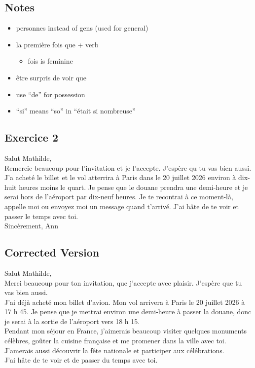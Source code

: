 \documentclass{book}
\begin{document}
        \subsection*{Notes}
            \begin{itemize}
                \item personnes instead of gens (used for general)
                \item la première fois que + verb
                \begin{itemize}
                    \item fois is feminine
                \end{itemize}
                \item être surpris de voir que
                \item use ``de'' for possession
                \item ``si'' means ``so'' in ``était si nombreuse''
            \end{itemize}

        \newpage 

        \subsection{Exercice 2}
            Salut Mathilde,
            \\
            Remercie beaucoup pour l'invitation et je l'accepte. J'espère qu tu vas bien aussi. 
            J'a acheté le billet et le vol atterrira à Paris dans le 20 juillet 2026 environ à dix-huit heures moins le quart.
            Je pense que le douane prendra une demi-heure et je serai hors de l'aéroport par dix-neuf heures. 
            Je te recontrai à ce moment-là, appelle moi ou envoyez moi un message quand t'arrivé. 
            J'ai hâte de te voir et passer le temps avec toi.
            \\
            Sincèrement,
            Ann

        \subsection*{Corrected Version}
            Salut Mathilde,
            \\
            Merci beaucoup pour ton invitation, que j'accepte avec plaisir. J'espère que tu vas bien aussi.
            \\
            J'ai déjà acheté mon billet d'avion. Mon vol arrivera à Paris le 20 juillet 2026 à 17 h 45. 
            Je pense que je mettrai environ une demi-heure à passer la douane, donc je serai à la sortie de l'aéroport vers 18 h 15.
            \\
            Pendant mon séjour en France, j'aimerais beaucoup visiter quelques monuments célèbres, goûter la cuisine française et me promener dans la ville avec toi.
            J'amerais aussi découvrir la fête nationale et participer aux célébrations.
            \\
            J'ai hâte de te voir et de passer du temps avec toi.
\end{document}
